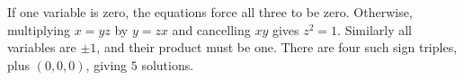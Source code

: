 If one variable is zero, the equations force all three to be zero. Otherwise, multiplying $x=yz$ by $y=zx$ and cancelling $xy$ gives $z^2=1$. Similarly all variables are $\pm1$, and their product must be one. There are four such sign triples, plus $(0,0,0)$, giving $\boxed5$ solutions.
